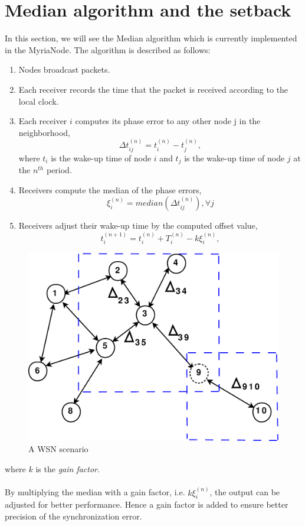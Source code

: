 \documentclass[a4paper,10pt]{report}
\begin{document}
\section{\textbf{Median algorithm and the setback}} In this section, we will see the Median algorithm which is
currently implemented in the MyriaNode. The algorithm is described
as follows:
\begin{enumerate}
\item Nodes broadcast packets.
\item Each receiver records the time that the packet is received according to the local clock.
\item Each receiver $i$ computes its phase error to any other node j in the neighborhood,
\begin{equation}
\Delta t_{ij}^{(n)} = t_i^{(n)} - t_j^{(n)} ,
\end{equation}
where $t_i$ is the wake-up time of node $i$ and $t_j$ is the wake-up
time of node $j$ at the $n^{th}$ period.
\item Receivers compute the median of the phase errors,
\begin{equation}
\xi_i^{(n)} = median(\Delta t_{ij}^{(n)}) , \forall j
\end{equation}
\item Receivers adjust their wake-up time by the computed offset value,
\begin{equation}
t_{i}^{(n+1)} = t_i^{(n)} + T_i^{(n)} - k\xi_i^{(n)},
\end{equation}
\end{enumerate}
\begin{figure}
\centering
\includegraphics[width=0.6 \textwidth]{node_field}
\caption{A WSN scenario} \label{wsn}
\end{figure}
where $k$ is the \textit{gain factor}. \paragraph*{}
By multiplying the median with a gain factor, i.e. $k\xi_i^{(n)}$, the output can be adjusted for better performance. Hence a gain factor is added to ensure better precision of the synchronization error.
\end{document}
